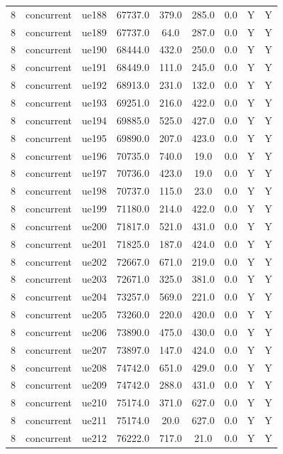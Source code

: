 \begin{table}[ht]
\begin{tabular}{|c|c|c|c|c|c|c|c|c|}
8 & concurrent & ue188 & 67737.0 & 379.0 & 285.0 & 0.0 & Y & Y \\
8 & concurrent & ue189 & 67737.0 & 64.0 & 287.0 & 0.0 & Y & Y \\
8 & concurrent & ue190 & 68444.0 & 432.0 & 250.0 & 0.0 & Y & Y \\
8 & concurrent & ue191 & 68449.0 & 111.0 & 245.0 & 0.0 & Y & Y \\
8 & concurrent & ue192 & 68913.0 & 231.0 & 132.0 & 0.0 & Y & Y \\
8 & concurrent & ue193 & 69251.0 & 216.0 & 422.0 & 0.0 & Y & Y \\
8 & concurrent & ue194 & 69885.0 & 525.0 & 427.0 & 0.0 & Y & Y \\
8 & concurrent & ue195 & 69890.0 & 207.0 & 423.0 & 0.0 & Y & Y \\
8 & concurrent & ue196 & 70735.0 & 740.0 & 19.0 & 0.0 & Y & Y \\
8 & concurrent & ue197 & 70736.0 & 423.0 & 19.0 & 0.0 & Y & Y \\
8 & concurrent & ue198 & 70737.0 & 115.0 & 23.0 & 0.0 & Y & Y \\
8 & concurrent & ue199 & 71180.0 & 214.0 & 422.0 & 0.0 & Y & Y \\
8 & concurrent & ue200 & 71817.0 & 521.0 & 431.0 & 0.0 & Y & Y \\
8 & concurrent & ue201 & 71825.0 & 187.0 & 424.0 & 0.0 & Y & Y \\
8 & concurrent & ue202 & 72667.0 & 671.0 & 219.0 & 0.0 & Y & Y \\
8 & concurrent & ue203 & 72671.0 & 325.0 & 381.0 & 0.0 & Y & Y \\
8 & concurrent & ue204 & 73257.0 & 569.0 & 221.0 & 0.0 & Y & Y \\
8 & concurrent & ue205 & 73260.0 & 220.0 & 420.0 & 0.0 & Y & Y \\
8 & concurrent & ue206 & 73890.0 & 475.0 & 430.0 & 0.0 & Y & Y \\
8 & concurrent & ue207 & 73897.0 & 147.0 & 424.0 & 0.0 & Y & Y \\
8 & concurrent & ue208 & 74742.0 & 651.0 & 429.0 & 0.0 & Y & Y \\
8 & concurrent & ue209 & 74742.0 & 288.0 & 431.0 & 0.0 & Y & Y \\
8 & concurrent & ue210 & 75174.0 & 371.0 & 627.0 & 0.0 & Y & Y \\
8 & concurrent & ue211 & 75174.0 & 20.0 & 627.0 & 0.0 & Y & Y \\
8 & concurrent & ue212 & 76222.0 & 717.0 & 21.0 & 0.0 & Y & Y \\

\end{tabular}
\end{table}
